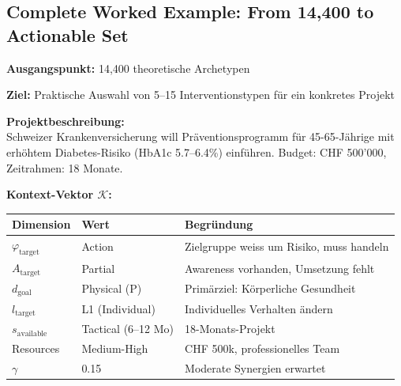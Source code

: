 \subsection{Complete Worked Example: From 14,400 to Actionable Set}
\label{sec:hhh-complete-example}

\begin{tcolorbox}[colback=blue!5!white, colframe=blue!75!black,
    title=\textbf{Fallbeispiel: Gesundheitsprogramm zur Diabetes-Prävention}]

\textbf{Ausgangspunkt:} 14,400 theoretische Archetypen

\textbf{Ziel:} Praktische Auswahl von 5--15 Interventionstypen für ein konkretes Projekt

\end{tcolorbox}

\begin{tcolorbox}[colback=yellow!5!white, colframe=yellow!75!black,
    title=\textbf{Schritt 1: Kontext $\mathcal{K}$ spezifizieren}]

\textbf{Projektbeschreibung:} \\
Schweizer Krankenversicherung will Präventionsprogramm für 45-65-Jährige mit erhöhtem Diabetes-Risiko (HbA1c 5.7--6.4\%) einführen. Budget: CHF 500'000, Zeitrahmen: 18 Monate.

\medskip
\textbf{Kontext-Vektor $\mathcal{K}$:}
\begin{center}
\begin{tabular}{@{}lll@{}}
\toprule
\textbf{Dimension} & \textbf{Wert} & \textbf{Begründung} \\
\midrule
$\varphi_{\text{target}}$ & Action & Zielgruppe weiss um Risiko, muss handeln \\
$A_{\text{target}}$ & Partial & Awareness vorhanden, Umsetzung fehlt \\
$d_{\text{goal}}$ & Physical (P) & Primärziel: Körperliche Gesundheit \\
$l_{\text{target}}$ & L1 (Individual) & Individuelles Verhalten ändern \\
$s_{\text{available}}$ & Tactical (6--12 Mo) & 18-Monats-Projekt \\
Resources & Medium-High & CHF 500k, professionelles Team \\
$\gamma$ & 0.15 & Moderate Synergien erwartet \\
\bottomrule
\end{tabular}
\end{center}

\end{tcolorbox}

